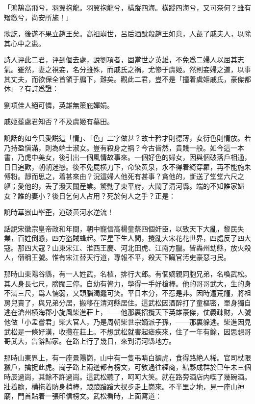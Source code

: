 \begin{myquote}
「鴻鵠高飛兮，羽翼抱龍。羽翼抱龍兮，橫蹤四海。橫蹤四海兮，又可奈何？雖有矰繳兮，尚安所施！」
\end{myquote}

歌訖，後遂不果立趙王矣。高祖崩世，呂后酒酖殺趙王如意，人彘了戚夫人，以除其心中之患。

詩人评此二君，评到個去處，說劉項者，固當世之英雄，不免爲二婦人以屈其志氣。雖然，妻之視妾，名分雖殊，而戚氏之祸，尤慘于虞姬。然則妾婦之道，以事其丈夫，而欲保全首領于牖下，難矣。觀此二君，豈不是「撞着虞姬戚氏，豪傑都休」？有詩爲證：

\begin{myquote}
劉項佳人絕可憐，英雄無策庇嬋娟。

戚姬塟處君知否？不及虞姬有墓田。
\end{myquote}

說話的如今只愛説這「情」、「色」二字做甚？故士矜才則德薄，女衍色則情放。若乃持盈愼滿，則為端士淑女。豈有殺身之祸？今古皆然，貴賤一般。如今這一本書，乃虎中美女，後引出一個風情故事來。一個好色的婦女，因與個破落戶相通，日日追歡，朝朝迷戀。後不免屍横刀下，命染黄泉，永不得着綺穿羅，再不能施朱傅粉。靜而思之，着甚來由？況這婦人他死有甚事？貪他的，斷送了堂堂六尺之軀；愛他的，丢了潑天關産業。驚動了東平府，大鬧了清河縣。端的不知誰家婦女？誰的妻小？後日乞何人占用？死於何人之手？正是：

\begin{myquote}
說時華嶽山峯歪，道破黄河水逆流！
\end{myquote}

話說宋徽宗皇帝政和年間，朝中寵信高楊童蔡四個奸臣，以致天下大亂，黎民失業，百姓倒懸，四方盗賊蜂起。罡星下生人間，攪亂大宋花花世界，四處反了四大寇。那四大寇？山東宋江、淮西王慶、河北田虎、江南方臘。皆轟州劫縣，放火殺人，僭稱王號。惟有宋江替天行道，專報不平，殺天下贜官汚吏豪惡刁民。

那時山東陽谷縣，有一人姓武，名植，排行大郎。有個嫡親同胞兄弟，名喚武松。其人身長七尺，膀闊三停。自幼有膂力，學得一手好槍棒。他的哥哥武大，生的身不滿三尺，爲人懦弱，又頭腦濁蠢可笑。平日本分，不惹是非。因時遭荒饉，將祖房兒賣了，與兄弟分居，搬移在清河縣居住。這武松因酒醉打了童樞密，單身獨自逃在滄州横海郡小旋風柴進莊上，——他那裏招攬天下英雄豪傑，仗義疎财，人號他做「小孟嘗君」柴大官人，乃是周朝柴世宗嫡派子孫，——那裏躲逃。柴進因見武松是一條好漢，收攬在莊上。不想武松就害起瘧疾來，住了一年有餘，因思想哥哥武大，告辭歸家。在路上行了幾日，來到清河縣地方。

那時山東界上，有一座景陽崗，山中有一隻弔睛白額虎，食得路絶人稀。官司杖限獵戶，擒捉此虎。崗子路上兩邊都有榜文，可敎過往經商，結夥成群於巳午未三個時辰過崗，其餘不許過崗。這武松聽了，呵呵大笑。就在路旁酒店内喫了幾碗酒。壯着膽，横拖着防身梢棒，踉踉蹌蹌大扠步走上崗來。不半里之地，見一座山神廟，門首貼着一張印信榜文。武松看時，上面寫道：

